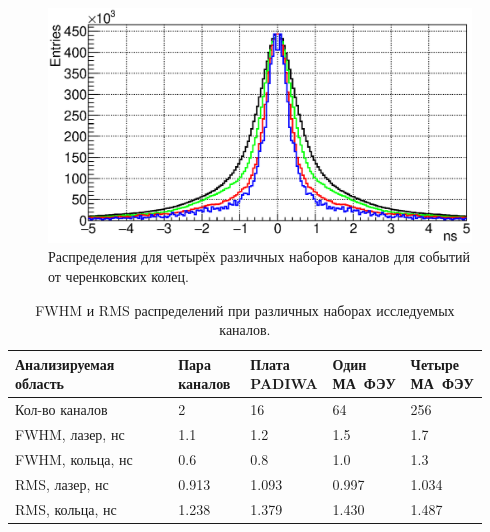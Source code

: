 \begin{figure}[H]
\includegraphics[width=1.0\textwidth]{pictures/25_TimePrecision_evolution_rings_feb2017.eps}
\caption{Распределения для четырёх различных наборов каналов для событий от черенковских колец.}
\label{fig:TimeResEvolutionRings}
\end{figure}

\begin{table}[H]
\caption{FWHM и RMS распределений при различных наборах исследуемых каналов.}
\label{tabl:EvolutionParams}
\begin{tabular}{ | p{0.34\linewidth} | p{0.15\linewidth} | p{0.15\linewidth} | p{0.15\linewidth} | p{0.15\linewidth} | }
	\hline
	Анализируемая область & Пара каналов & Плата PADIWA & Один МА~ФЭУ & Четыре МА~ФЭУ \\
	\hline
	Кол-во каналов & 2 & 16 & 64 & 256 \\
	\hline
	FWHM, лазер, нс & 1.1 & 1.2 & 1.5 & 1.7 \\
	\hline
	FWHM, кольца, нс & 0.6 & 0.8 & 1.0 & 1.3 \\
	\hline
	RMS, лазер, нс & 0.913 & 1.093 & 0.997 & 1.034 \\
	\hline
	RMS, кольца, нс & 1.238 & 1.379 & 1.430 & 1.487 \\
	\hline
\end{tabular}
\end{table}
